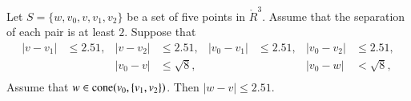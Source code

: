 


\newpage


\begin{lemma}
Let $S=\{w,v_0,v,v_1,v_2\}$ be a set of five points in $\ring{R}^3$.
Assume that the separation of each pair is at least $2$.
Suppose that
  $$\begin{array}{rlrlrlrl}
    |v-v_1|&\le 2.51, &
    |v-v_2|&\le 2.51, &
    |v_0-v_1|&\le 2.51,&
    |v_0-v_2|&\le 2.51,\\
    && |v_0-v|&\le \sqrt8,&
    &&|v_0-w|&< \sqrt8,\\
  \end{array}
  $$
Assume that $w\in{\operatorname{cone}}(v_0,\{v_1,v_2\})$.
Then $|w-v|\le 2.51$.
\end{lemma}

